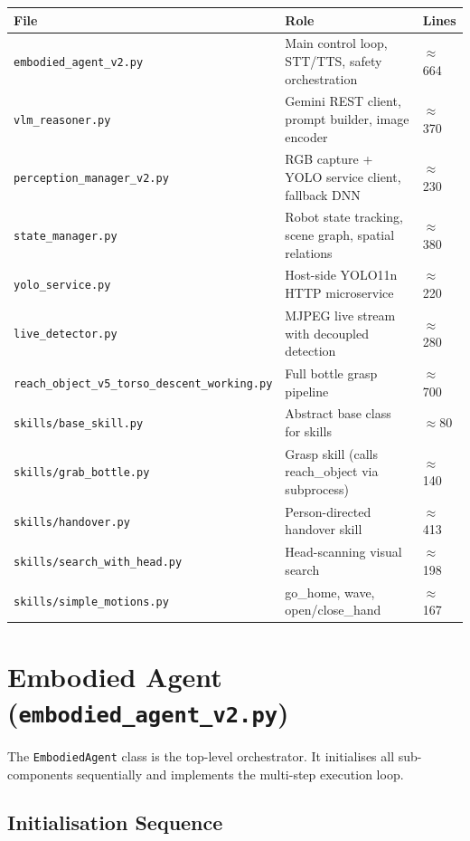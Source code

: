 \documentclass[12pt,a4paper]{report}
\begin{document}
\begin{center}
\begin{tabularx}{\linewidth}{lXl}
\toprule
\textbf{File} & \textbf{Role} & \textbf{Lines} \\
\midrule
\texttt{embodied\_agent\_v2.py}  & Main control loop, STT/TTS, safety orchestration & $\approx$664 \\
\texttt{vlm\_reasoner.py}        & Gemini REST client, prompt builder, image encoder & $\approx$370 \\
\texttt{perception\_manager\_v2.py} & RGB capture + YOLO service client, fallback DNN & $\approx$230 \\
\texttt{state\_manager.py}       & Robot state tracking, scene graph, spatial relations & $\approx$380 \\
\texttt{yolo\_service.py}        & Host-side YOLO11n HTTP microservice & $\approx$220 \\
\texttt{live\_detector.py}       & MJPEG live stream with decoupled detection & $\approx$280 \\
\texttt{reach\_object\_v5\_torso\_descent\_working.py} & Full bottle grasp pipeline & $\approx$700 \\
\texttt{skills/base\_skill.py}   & Abstract base class for skills & $\approx$80 \\
\texttt{skills/grab\_bottle.py}  & Grasp skill (calls reach\_object via subprocess) & $\approx$140 \\
\texttt{skills/handover.py}      & Person-directed handover skill & $\approx$413 \\
\texttt{skills/search\_with\_head.py} & Head-scanning visual search & $\approx$198 \\
\texttt{skills/simple\_motions.py} & go\_home, wave, open/close\_hand & $\approx$167 \\
\bottomrule
\end{tabularx}
\end{center}

\section{Embodied Agent (\texttt{embodied\_agent\_v2.py})}

The \texttt{EmbodiedAgent} class is the top-level orchestrator.  It initialises all
sub-components sequentially and implements the multi-step execution loop.

\subsection{Initialisation Sequence}
\end{document}
